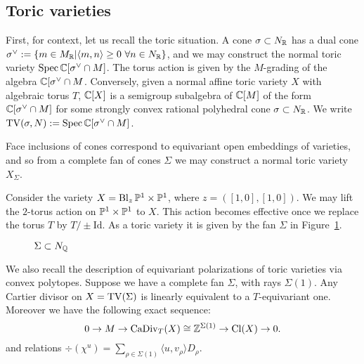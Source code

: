 \subsection{Toric varieties}
First, for context, let us recall the toric situation. A cone \(\sigma \subset N_{\mathbb{R}}\) has a dual cone \(\sigma^\vee := \{m \in M_{\mathbb{R}} | \langle m, n \rangle \ge 0 \ \forall n \in N_{\mathbb{R}}\}\), and we may construct the normal toric variety \(\operatorname{Spec} \mathbb{C}[\sigma^\vee \cap M]\). The torus action is given by the \(M\)-grading of the algebra \(\mathbb{C}[\sigma^\vee \cap M\).  Conversely, given a normal affine toric variety \(X\) with algebraic torus \(T\), \(\mathbb{C}[X]\) is a semigroup subalgebra of \(\mathbb{C}[M]\) of the form \(\mathbb{C}[\sigma^\vee \cap M]\) for some strongly convex rational polyhedral cone \(\sigma \subset N_{\mathbb{R}}\). We write \(\operatorname{TV}(\sigma,N):= \operatorname{Spec} \mathbb{C}[\sigma^\vee \cap M] \).

Face inclusions of cones correspond to equivariant open embeddings of varieties, and so from a complete fan of cones \(\Sigma\) we may construct a normal toric variety \(X_\Sigma\).
\begin{example}
Consider the variety \(X = \operatorname{Bl}_{z} \mathbb{P}^1 \times \mathbb{P}^1 \), where \(z = ( [1,0],[1,0]) \). We may lift the \(2\)-torus action on \(\mathbb{P}^1 \times \mathbb{P}^1 \) to \(X\). This action becomes effective once we replace the torus \(T\) by \(T/ \pm \text{Id}\). As a toric variety it is given by the fan \(\Sigma\) in Figure~\ref{fig:toricfan}.

\begin{figure}[h] \label{fig:toricfan}
\centering
	\caption{$\Sigma \subset N_{\mathbb{Q}}$}
\end{figure}
\end{example}
We also recall the description of equivariant polarizations of toric varieties via convex polytopes. Suppose we have a complete fan \(\Sigma\), with rays \(\Sigma(1)\). Any Cartier divisor on \(X = \operatorname{TV}(\Sigma)\) is linearly equivalent to a \(T\)-equivariant one. Moreover we have the following exact sequence:
\[
0 \to M \to \operatorname{CaDiv}_T(X) \cong \mathbb{Z}^{\Sigma(1)} \to \operatorname{Cl}(X) \to 0.
\]
and relations \(\div(\chi^u) = \sum_{\rho \in \Sigma(1)} \langle u, v_\rho \rangle D_\rho\).

